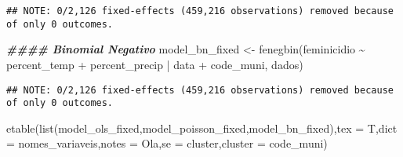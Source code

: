 \documentclass[
]{article}
\newenvironment{Shaded}{\begin{snugshade}}{\end{snugshade}}
\newcommand{\AttributeTok}[1]{\textcolor[rgb]{0.77,0.63,0.00}{#1}}
\newcommand{\DocumentationTok}[1]{\textcolor[rgb]{0.56,0.35,0.01}{\textbf{\textit{#1}}}}
\newcommand{\FunctionTok}[1]{\textcolor[rgb]{0.00,0.00,0.00}{#1}}
\newcommand{\NormalTok}[1]{#1}
\newcommand{\OtherTok}[1]{\textcolor[rgb]{0.56,0.35,0.01}{#1}}
\newcommand{\SpecialCharTok}[1]{\textcolor[rgb]{0.00,0.00,0.00}{#1}}
\newcommand{\StringTok}[1]{\textcolor[rgb]{0.31,0.60,0.02}{#1}}
\begin{document}
\begin{verbatim}
## NOTE: 0/2,126 fixed-effects (459,216 observations) removed because of only 0 outcomes.
\end{verbatim}

\begin{Shaded}
\begin{Highlighting}[]
\DocumentationTok{\#\#\#\# Binomial Negativo}
\NormalTok{model\_bn\_fixed }\OtherTok{\textless{}{-}} \FunctionTok{fenegbin}\NormalTok{(feminicidio  }\SpecialCharTok{\textasciitilde{}}\NormalTok{ percent\_temp }\SpecialCharTok{+}\NormalTok{ percent\_precip }\SpecialCharTok{|}\NormalTok{ data }\SpecialCharTok{+}\NormalTok{ code\_muni, dados)}
\end{Highlighting}
\end{Shaded}

\begin{verbatim}
## NOTE: 0/2,126 fixed-effects (459,216 observations) removed because of only 0 outcomes.
\end{verbatim}

\begin{Shaded}
\begin{Highlighting}[]
\FunctionTok{etable}\NormalTok{(}\FunctionTok{list}\NormalTok{(model\_ols\_fixed,model\_poisson\_fixed,model\_bn\_fixed),}\AttributeTok{tex =}\NormalTok{ T,}\AttributeTok{dict =}\NormalTok{ nomes\_variaveis,}\AttributeTok{notes =} \StringTok{\textquotesingle{}Ola\textquotesingle{}}\NormalTok{,}\AttributeTok{se =} \StringTok{\textquotesingle{}cluster\textquotesingle{}}\NormalTok{,}\AttributeTok{cluster =} \StringTok{\textquotesingle{}code\_muni\textquotesingle{}}\NormalTok{)}
\end{Highlighting}
\end{Shaded}
\end{document}
